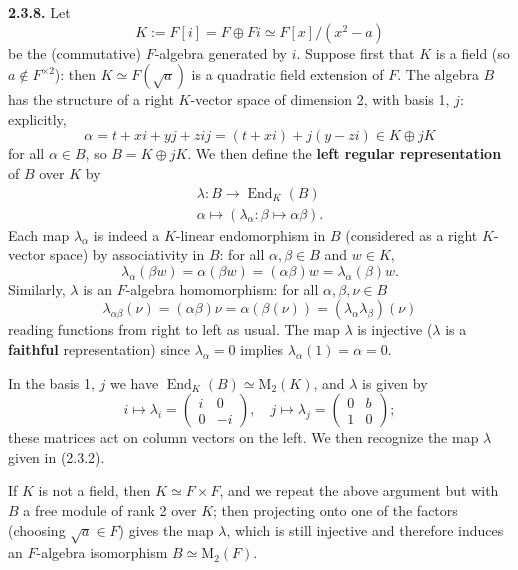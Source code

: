 \documentclass{article}
\theoremstyle{definition}
\begin{document}
\textbf{2.3.8.} Let
$$K := F[i] = F \oplus Fi \simeq F[x]/(x^2 - a)$$
be the (commutative) $F$-algebra generated by $i$. Suppose first that $K$ is a field (so $a \notin F^{\times 2}$): then $K \simeq F(\sqrt{a})$ is a quadratic field extension of $F$. The algebra $B$ has the structure of a right $K$-vector space of dimension 2, with basis 1, $j$: explicitly,
$$\alpha = t + xi + yj + zij = (t + xi) + j(y - zi) \in K \oplus jK$$
for all $\alpha \in B$, so $B = K \oplus jK$. We then define the \textbf{left regular representation} of $B$ over $K$ by
\begin{equation}
\begin{array}{l}
\lambda: B \to \operatorname{End}_K(B) \\
\alpha \mapsto (\lambda_\alpha: \beta \mapsto \alpha\beta).
\end{array} \tag{2.3.9}
\end{equation}
Each map $\lambda_\alpha$ is indeed a $K$-linear endomorphism in $B$ (considered as a right $K$-vector space) by associativity in $B$: for all $\alpha, \beta \in B$ and $w \in K$,
$$\lambda_\alpha(\beta w) = \alpha(\beta w) = (\alpha\beta)w = \lambda_\alpha(\beta)w.$$
Similarly, $\lambda$ is an $F$-algebra homomorphism: for all $\alpha, \beta, \nu \in B$
$$\lambda_{\alpha\beta}(\nu) = (\alpha\beta)\nu = \alpha(\beta(\nu)) = (\lambda_\alpha\lambda_\beta)(\nu)$$
reading functions from right to left as usual. The map $\lambda$ is injective ($\lambda$ is a \textbf{faithful} representation) since $\lambda_\alpha = 0$ implies $\lambda_\alpha(1) = \alpha = 0$.

In the basis 1, $j$ we have $\operatorname{End}_K(B) \simeq \mathrm{M}_2(K)$, and $\lambda$ is given by
\begin{equation}
i \mapsto \lambda_i = \begin{pmatrix} i & 0 \\ 0 & -i \end{pmatrix}, \quad j \mapsto \lambda_j = \begin{pmatrix} 0 & b \\ 1 & 0 \end{pmatrix}; \tag{2.3.10}
\end{equation}
these matrices act on column vectors on the left. We then recognize the map $\lambda$ given in (2.3.2).

If $K$ is not a field, then $K \simeq F \times F$, and we repeat the above argument but with $B$ a free module of rank 2 over $K$; then projecting onto one of the factors (choosing $\sqrt{a} \in F$) gives the map $\lambda$, which is still injective and therefore induces an $F$-algebra isomorphism $B \simeq \mathrm{M}_2(F)$.
\end{document}
